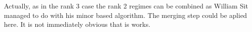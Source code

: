 Actually, as in the rank 3 case the rank 2 regimes can be combined as William Sit managed to
do with his minor based algorithm.  The merging step could be aplied here.  It is not immediately
obvious that is works.
 
%
%
%
%
